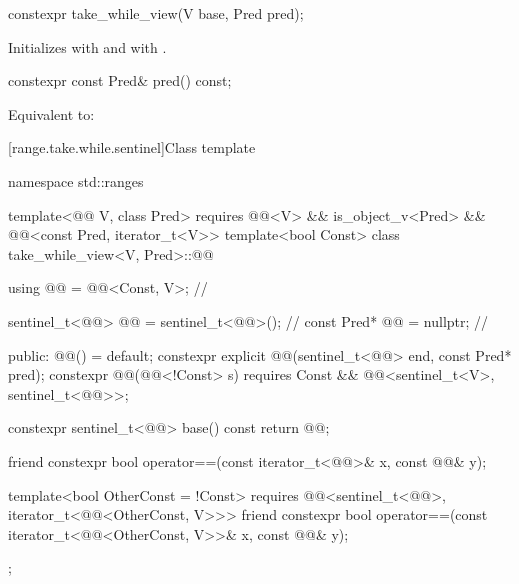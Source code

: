 %
\begin{itemdecl}
constexpr take_while_view(V base, Pred pred);
\end{itemdecl}

\begin{itemdescr}
\pnum
\effects
Initializes  with  and
 with .
\end{itemdescr}

%
\begin{itemdecl}
constexpr const Pred& pred() const;
\end{itemdecl}

\begin{itemdescr}
\pnum
\effects
Equivalent to: 
\end{itemdescr}

[range.take.while.sentinel]{Class template }

\begin{codeblock}
namespace std::ranges {
  template<@@ V, class Pred>
    requires @@<V> && is_object_v<Pred> &&
             @@<const Pred, iterator_t<V>>
  template<bool Const>
  class take_while_view<V, Pred>::@@ {
    using @@ = @@<Const, V>;                 // \expos

    sentinel_t<@@> @@ = sentinel_t<@@>();         // \expos
    const Pred* @@ = nullptr;                        // \expos

  public:
    @@() = default;
    constexpr explicit @@(sentinel_t<@@> end, const Pred* pred);
    constexpr @@(@@<!Const> s)
      requires Const && @@<sentinel_t<V>, sentinel_t<@@>>;

    constexpr sentinel_t<@@> base() const { return @@; }

    friend constexpr bool operator==(const iterator_t<@@>& x, const @@& y);

    template<bool OtherConst = !Const>
      requires @@<sentinel_t<@@>, iterator_t<@@<OtherConst, V>>>
    friend constexpr bool operator==(const iterator_t<@@<OtherConst, V>>& x,
                                     const @@& y);
  };
}
\end{codeblock}

